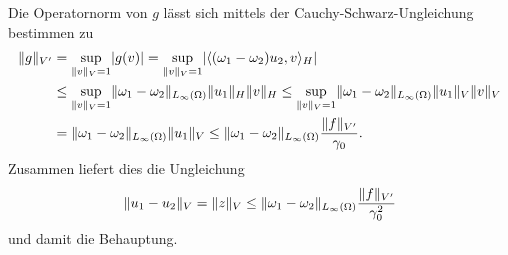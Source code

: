 \begin{Lemma}
\begin{Beweis}
        Die Operatornorm von $g$ lässt sich mittels der Cauchy-Schwarz-Ungleichung bestimmen zu
        \begin{equation}
            \begin{aligned}
                \lVert g\rVert_{V'}
                  &=    \sup_{\lVert v\rVert_{V} = 1} \lvert g(v)\rvert
                   =    \sup_{\lVert v\rVert_{V} = 1} \lvert\langle(\omega_{1} - \omega_{2}) u_{2},v\rangle_{H}\rvert
                \\&\leq \sup_{\lVert v\rVert_{V} = 1} \lVert\omega_{1} - \omega_{2}\rVert_{L_{\infty}(\Omega)} \lVert u_{1}\rVert_{H} \lVert v\rVert_{H}
                   \leq \sup_{\lVert v\rVert_{V} = 1} \lVert\omega_{1} - \omega_{2}\rVert_{L_{\infty}(\Omega)} \lVert u_{1}\rVert_{V} \lVert v\rVert_{V}
                \\&=    \lVert\omega_{1} - \omega_{2}\rVert_{L_{\infty}(\Omega)} \lVert u_{1}\rVert_{V}
                   \leq \lVert\omega_{1} - \omega_{2}\rVert_{L_{\infty}(\Omega)} \frac{\lVert f\rVert_{V'}}{\gamma_{0}}.
            \end{aligned}
        \end{equation}
        Zusammen liefert dies die Ungleichung
        \begin{equation}
            \lVert u_{1} - u_{2}\rVert_{V}
            = \lVert z\rVert_{V} \leq \lVert\omega_{1} - \omega_{2}\rVert_{L_{\infty}(\Omega)} \frac{\lVert f\rVert_{V'}}{\gamma_{0}^{2}}
        \end{equation}
        und damit die Behauptung.
    \end{Beweis}
\end{Lemma}

